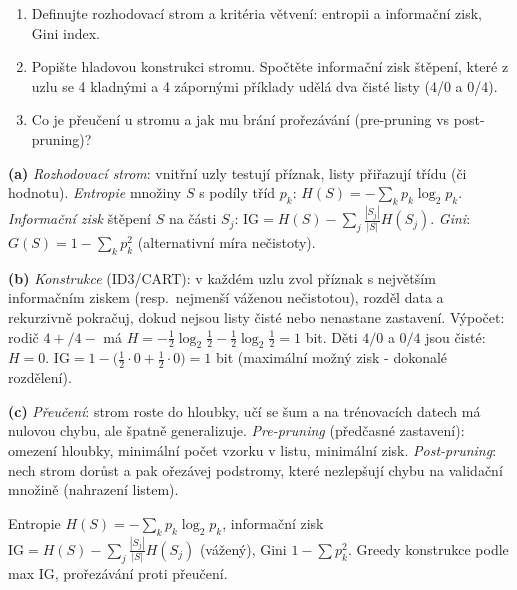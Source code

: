 \begin{zadani}
\begin{enumerate}[label=(\alph*)]
  \item {} Definujte rozhodovací strom a kritéria větvení: entropii a informační zisk, Gini index.
  \item {} Popište hladovou konstrukci stromu. Spočtěte informační zisk štěpení, které z uzlu se 4 kladnými a 4 zápornými příklady udělá dva čisté listy (4/0 a 0/4).
  \item {} Co je přeučení u stromu a jak mu brání prořezávání (pre-pruning vs post-pruning)?
\end{enumerate}
\end{zadani}

\begin{reseni}
\textbf{(a)} \emph{Rozhodovací strom}: vnitřní uzly testují příznak, listy přiřazují třídu (či hodnotu). \emph{Entropie} množiny $S$ s podíly tříd $p_k$: $H(S)=-\sum_k p_k\log_2 p_k$. \emph{Informační zisk} štěpení $S$ na části $S_j$: $\mathrm{IG}=H(S)-\sum_j\frac{|S_j|}{|S|}H(S_j)$. \emph{Gini}: $G(S)=1-\sum_k p_k^2$ (alternativní míra nečistoty).

\textbf{(b)} \emph{Konstrukce} (ID3/CART): v každém uzlu zvol příznak s největším informačním ziskem (resp.\ nejmenší váženou nečistotou), rozděl data a rekurzivně pokračuj, dokud nejsou listy čisté nebo nenastane zastavení. Výpočet: rodič $4{+}/4{-}$ má $H=-\tfrac12\log_2\tfrac12-\tfrac12\log_2\tfrac12=1$ bit. Děti $4/0$ a $0/4$ jsou čisté: $H=0$. $\mathrm{IG}=1-\big(\tfrac12\cdot0+\tfrac12\cdot0\big)=1$ bit (maximální možný zisk - dokonalé rozdělení).

\textbf{(c)} \emph{Přeučení}: strom roste do hloubky, učí se šum a na trénovacích datech má nulovou chybu, ale špatně generalizuje. \emph{Pre-pruning} (předčasné zastavení): omezení hloubky, minimální počet vzorku v listu, minimální zisk. \emph{Post-pruning}: nech strom dorůst a pak ořezávej podstromy, které nezlepšují chybu na validační množině (nahrazení listem).
\end{reseni}

\begin{jadro}
Entropie $H(S)=-\sum_k p_k\log_2 p_k$, informační zisk $\mathrm{IG}=H(S)-\sum_j\frac{|S_j|}{|S|}H(S_j)$ (vážený), Gini $1-\sum p_k^2$. Greedy konstrukce podle max IG, prořezávání proti přeučení.
\end{jadro}

